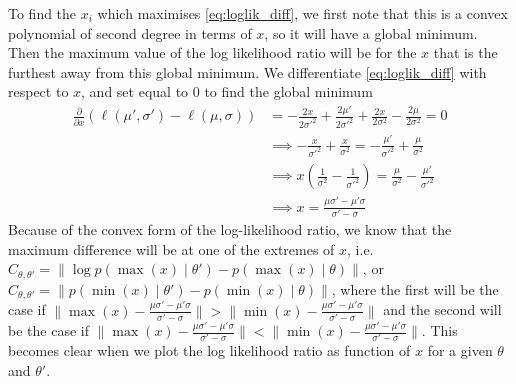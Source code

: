 To find the $x_i$ which maximises \eqref{eq:loglik_diff}, we first note that this is a convex polynomial of second degree in terms of $x$,  so it will have a global minimum. Then the maximum value of the log likelihood ratio will be for the $x$ that is the  furthest away from this global minimum.
We differentiate \eqref{eq:loglik_diff} with respect to $x$, and set equal to $0$ to find the global minimum 
\begin{equation}
\begin{split}
    \frac{\partial}{\partial x} \left(\ell\left(\mu', \sigma'\right) - \ell\left(\mu, \sigma\right)\right) &=  -\frac{2x}{2\sigma'^2} + \frac{2\mu'}{2\sigma'^2} + \frac{2x}{2\sigma^2} - \frac{2\mu}{2\sigma^2} = 0 \\
    &\implies -\frac{x}{\sigma'^2} + \frac{x}{\sigma^2} = -\frac{\mu'}{\sigma'^2} + \frac{\mu}{\sigma^2} \\
    &\implies x \left(\frac{1}{\sigma^2} - \frac{1}{\sigma'^2}\right) = \frac{\mu}{\sigma^2} - \frac{\mu'}{\sigma'^2} \\
    &\implies x =  \frac{\mu\sigma' - \mu'\sigma}{\sigma' - \sigma}
\end{split}
\end{equation}{}
Because of the convex form of the log-likelihood ratio, we know that the maximum difference will be at one of the extremes of $x$, i.e. $C_{\theta, \theta'} = \lVert \log p\left(\max\left(x\right)\mid \theta'\right) - p\left(\max\left(x\right)\mid \theta\right)\rVert$, or $C_{\theta, \theta'} = \lVert p\left(\min\left(x\right)\mid \theta'\right) - p\left(\min\left(x\right)\mid \theta\right)\rVert$, where the first will be the case if $\lVert \max\left(x\right) - \frac{\mu\sigma' - \mu'\sigma}{\sigma' - \sigma}\rVert > \lVert \min\left(x\right) - \frac{\mu\sigma' - \mu'\sigma}{\sigma' - \sigma}\rVert$
and the second will be the case if 
$\lVert\max\left(x\right) - \frac{\mu\sigma' - \mu'\sigma}{\sigma' - \sigma}\rVert < \lVert \min\left(x\right) - \frac{\mu\sigma' - \mu'\sigma}{\sigma' - \sigma}\rVert$. This becomes clear when we plot the log likelihood ratio as function of $x$ for a given $\theta$ and $\theta'$. 
